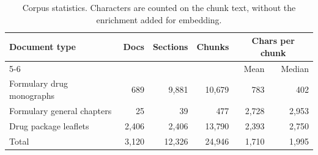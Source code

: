 \begin{table}[htb]
\centering
\caption{Corpus statistics. Characters are counted on the chunk text, without the enrichment added for embedding.}
\label{tab:corpus}
\small
\setlength{\tabcolsep}{5pt}
\begin{tabular}{lrrrrr}
\toprule
Document type & Docs & Sections & Chunks & \multicolumn{2}{c}{Chars per chunk} \\
\cmidrule(l){5-6}
 & & & & Mean & Median \\
\midrule
Formulary drug monographs & 689 & 9{,}881 & 10{,}679 & 783 & 402 \\
Formulary general chapters & 25 & 39 & 477 & 2{,}728 & 2{,}953 \\
Drug package leaflets & 2{,}406 & 2{,}406 & 13{,}790 & 2{,}393 & 2{,}750 \\
\midrule
Total & 3{,}120 & 12{,}326 & 24{,}946 & 1{,}710 & 1{,}995 \\
\bottomrule
\end{tabular}
\end{table}
